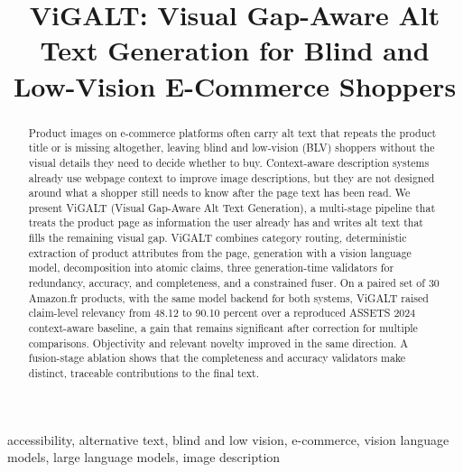 \title{ViGALT: Visual Gap-Aware Alt Text Generation for Blind and Low-Vision E-Commerce Shoppers}

\author{
\and
{}
}

\maketitle

\begin{abstract}
Product images on e-commerce platforms often carry alt text that repeats the product title or is missing altogether, leaving blind and low-vision (BLV) shoppers without the visual details they need to decide whether to buy. Context-aware description systems already use webpage context to improve image descriptions, but they are not designed around what a shopper still needs to know after the page text has been read. We present ViGALT (Visual Gap-Aware Alt Text Generation), a multi-stage pipeline that treats the product page as information the user already has and writes alt text that fills the remaining visual gap. ViGALT combines category routing, deterministic extraction of product attributes from the page, generation with a vision language model, decomposition into atomic claims, three generation-time validators for redundancy, accuracy, and completeness, and a constrained fuser. On a paired set of 30 Amazon.fr products, with the same model backend for both systems, ViGALT raised claim-level relevancy from 48.12 to 90.10 percent over a reproduced ASSETS 2024 context-aware baseline, a gain that remains significant after correction for multiple comparisons. Objectivity and relevant novelty improved in the same direction. A fusion-stage ablation shows that the completeness and accuracy validators make distinct, traceable contributions to the final text.
\end{abstract}

\begin{IEEEkeywords}
accessibility, alternative text, blind and low vision, e-commerce, vision language models, large language models, image description
\end{IEEEkeywords}
